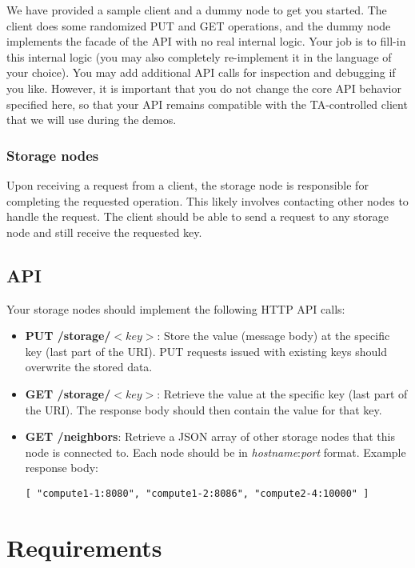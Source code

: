 \documentclass[a4paper]{article}
\begin{document}
We have provided a sample client and a dummy node to get you started.
The client does some randomized PUT and GET operations,
and the dummy node implements the facade of the API with no real internal logic.
Your job is to fill-in this internal logic
(you may also completely re-implement it in the language of your choice).
You may add additional API calls for inspection and debugging if you like.
However, it is important that you do not change the core API behavior specified here,
so that your API remains compatible with the TA-controlled client that we will use during the demos.

\subsubsection{Storage nodes}
Upon receiving a request from a client, the storage node is responsible for completing the requested operation.
This likely involves contacting other nodes to handle the request.
The client should be able to send a request to any storage node
and still receive the requested key.

\subsection{API}
Your storage nodes should implement the following HTTP API calls:

\begin{itemize}
	\item \textbf{PUT /storage/$<key>$}: Store the value (message body) at the specific key (last part of the URI). PUT requests issued with existing keys should overwrite the stored data.
	
	\item \textbf{GET /storage/$<key>$}: Retrieve the value at the specific key (last part of the URI). The response body should then contain the value for that key.

        \item \textbf{GET /neighbors}:
            Retrieve a JSON array of other storage nodes that this node is connected to. Each node should be in \textit{hostname}:\textit{port} format. Example response body:

\begin{verbatim}
[ "compute1-1:8080", "compute1-2:8086", "compute2-4:10000" ]
\end{verbatim}
\end{itemize}

\section{Requirements}
\end{document}
